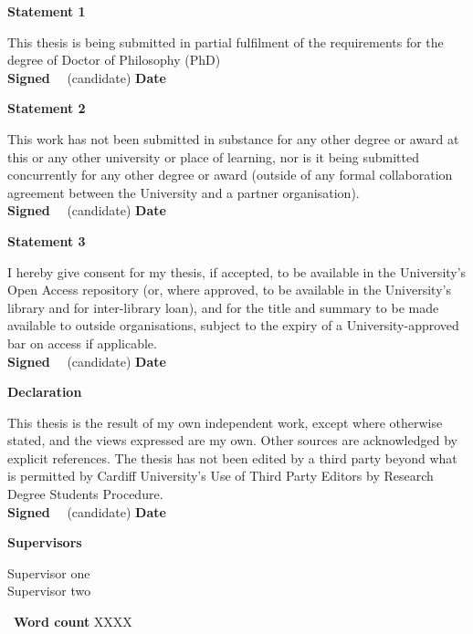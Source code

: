 \newpage\thispagestyle{empty}\cleardoublepage

\thispagestyle{plain}

\textbf{\large Statement 1}

This thesis is being submitted in partial fulfilment of the requirements for the degree of Doctor of Philosophy (PhD)\\
\textbf{Signed} \ \dotfill \ (candidate) \hspace*{1em} \textbf{Date}\ \ \ \dotfill

\textbf{\large Statement 2}

This work has not been submitted in substance for any other degree or award at this or any other university or place of learning, nor is it being submitted concurrently for any other degree or award (outside of any formal collaboration agreement between the University and a partner organisation).\\
\textbf{Signed} \ \dotfill \ (candidate) \hspace*{1em} \textbf{Date}\ \ \ \dotfill

\textbf{\large Statement 3}

I hereby give consent for my thesis, if accepted, to be available in the University's Open Access repository (or, where approved, to be available in the University's library and for inter-library loan), and for the title and summary to be made available to outside organisations, subject to the expiry of a University-approved bar on access if applicable.\\
\textbf{Signed} \ \dotfill \ (candidate) \hspace*{1em} \textbf{Date}\ \ \ \dotfill

\textbf{\large Declaration}

This thesis is the result of my own independent work, except where otherwise stated, and the views expressed are my own. Other sources are acknowledged by explicit references. The thesis has not been edited by a third party beyond what is permitted by Cardiff University's Use of Third Party Editors by Research Degree Students Procedure.\\
\textbf{Signed} \ \dotfill \ (candidate) \hspace*{1em} \textbf{Date}\ \ \ \dotfill

\vfill

\textbf{Supervisors} \ \parbox[t]{0.5\linewidth}{Supervisor one\\Supervisor two}  \ \hfill \textbf{Word count} XXXX